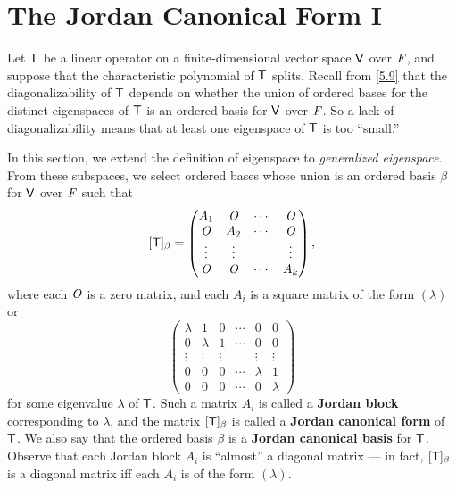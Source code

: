 \section{The Jordan Canonical Form I}\label{sec:7.1}

\begin{defn}\label{7.1.1}
  Let \(\mathsf{T}\) be a linear operator on a finite-dimensional vector space \(\mathsf{V}\) over \(\mathit{F}\), and suppose that the characteristic polynomial of \(\mathsf{T}\) splits.
  Recall from \cref{5.9} that the diagonalizability of \(\mathsf{T}\) depends on whether the union of ordered bases for the distinct eigenspaces of \(\mathsf{T}\) is an ordered basis for \(\mathsf{V}\) over \(\mathit{F}\).
  So a lack of diagonalizability means that at least one eigenspace of \(\mathsf{T}\) is too ``small.''

  In this section, we extend the definition of eigenspace to \emph{generalized eigenspace}.
  From these subspaces, we select ordered bases whose union is an ordered basis \(\beta\) for \(\mathsf{V}\) over \(\mathit{F}\) such that
  \[
    [\mathsf{T}]_{\beta} = \begin{pmatrix}
      A_1    & \mathit{O}    & \cdots & \mathit{O}    \\
      \mathit{O}    & A_2    & \cdots & \mathit{O}    \\
      \vdots & \vdots &        & \vdots \\
      \mathit{O}    & \mathit{O}    & \cdots & A_k
    \end{pmatrix},
  \]
  where each \(\mathit{O}\) is a zero matrix, and each \(A_i\) is a square matrix of the form \((\lambda)\) or
  \[
    \begin{pmatrix}
      \lambda & 1       & 0      & \cdots & 0       & 0       \\
      0       & \lambda & 1      & \cdots & 0       & 0       \\
      \vdots  & \vdots  & \vdots &        & \vdots  & \vdots  \\
      0       & 0       & 0      & \cdots & \lambda & 1       \\
      0       & 0       & 0      & \cdots & 0       & \lambda
    \end{pmatrix}
  \]
  for some eigenvalue \(\lambda\) of \(\mathsf{T}\).
  Such a matrix \(A_i\) is called a \textbf{Jordan block} corresponding to \(\lambda\), and the matrix \([\mathsf{T}]_{\beta}\) is called a \textbf{Jordan canonical form} of \(\mathsf{T}\).
  We also say that the ordered basis \(\beta\) is a \textbf{Jordan canonical basis} for \(\mathsf{T}\).
  Observe that each Jordan block \(A_i\) is ``almost'' a diagonal matrix
  ---
  in fact, \([\mathsf{T}]_{\beta}\) is a diagonal matrix iff each \(A_i\) is of the form \((\lambda)\).
\end{defn}

